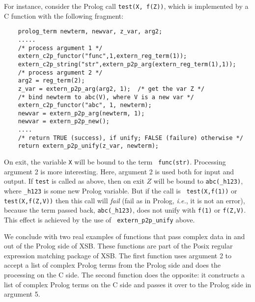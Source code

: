For instance, consider the Prolog call {\tt test(X, f(Z))},
which is implemented by a C function with the following fragment:
\begin{verbatim}
    prolog_term newterm, newvar, z_var, arg2;
    .....
    /* process argument 1 */
    extern_c2p_functor("func",1,extern_reg_term(1));
    extern_c2p_string("str",extern_p2p_arg(extern_reg_term(1),1));
    /* process argument 2 */
    arg2 = reg_term(2);
    z_var = extern_p2p_arg(arg2, 1);  /* get the var Z */
    /* bind newterm to abc(V), where V is a new var */
    extern_c2p_functor("abc", 1, newterm);
    newvar = extern_p2p_arg(newterm, 1);
    newvar = extern_p2p_new();
    ....
    /* return TRUE (success), if unify; FALSE (failure) otherwise */
    return extern_p2p_unify(z_var, newterm);
\end{verbatim}
On exit, the variable {\tt X} will be bound to the term {\tt
  func(str)}.  Processing argument 2 is more interesting. Here,
argument 2 is used both for input and output. If {\tt test} is called
as above, then on exit $Z$ will be bound to {\tt abc(\_h123)}, where
{\tt \_h123} is some new Prolog variable. But if the call is {\tt
  test(X,f(1))} or {\tt test(X,f(Z,V))} then this call will
\emph{fail} (fail as in Prolog, {\it i.e.}, it is not an error),
because the term passed back, {\tt abc(\_h123)}, does not unify with
{\tt f(1)} or {\tt f(Z,V)}. This effect is achieved by the use of {\tt
  extern\_p2p\_unify} above.

We conclude with two real examples of functions that pass complex data
in and out of the Prolog side of XSB. These functions are part of the
Posix regular expression matching package of XSB. The first function
uses argument 2 to accept a list of complex Prolog terms from the
Prolog side and does the processing on the C side. The second function
does the opposite: it constructs a list of complex Prolog terms on the
C side and passes it over to the Prolog side in argument 5.

